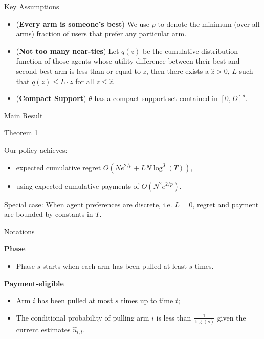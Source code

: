 \documentclass[serif]{beamer}
\begin{document}
\begin{frame}{Key Assumptions}
\begin{itemize}[label=\textbullet]
\item (\textbf{Every arm is someone's best}) We use $p$ to denote the minimum (over all arms) fraction of users that prefer any particular arm.
\vspace{0.2cm}
\item (\textbf{Not too many near-ties}) Let $q(z)$ be the cumulative distribution function of those agents whose utility difference between their best and second best arm is less than or equal to $z$, then there exists a $\hat{z}>0$, $L$ such that $q(z)\leq L\cdot z$ for all $z\leq \hat{z}$.
\vspace{0.2cm}
\item (\textbf{Compact Support}) $\theta$ has a compact support set contained in $[0,D]^{d}$.\
\end{itemize}

\end{frame}

\begin{frame}{Main Result}
\begin{block}{Theorem 1}

Our policy achieves:
\begin{itemize}
\item expected cumulative regret $O (N e^{2/p} + L N \log^3(T))$,
\item using expected cumulative payments of $O(N^2 e^{2/p})$.
\end{itemize}
\end{block}

Special case: 
When agent preferences are discrete, i.e. $L=0$,
regret and payment are bounded by constants in $T$.



\end{frame}
\begin{frame}{Notations}

\textbf{Phase}
\begin{itemize}[label=\textbullet]
\item Phase $s$ starts when each arm has been pulled at least $s$ times.
\end{itemize}

\vspace{0.7cm}
\textbf{Payment-eligible}
\begin{itemize}[label=\textbullet]
\item Arm $i$ has been pulled at most $s$ times up to time $t$;
\item The conditional probability of pulling arm $i$ is less than $\frac{1}{\log(s)}$ given the current estimates $\hat{u}_{i,t}$.
\end{itemize}

\end{frame}
\end{document}
